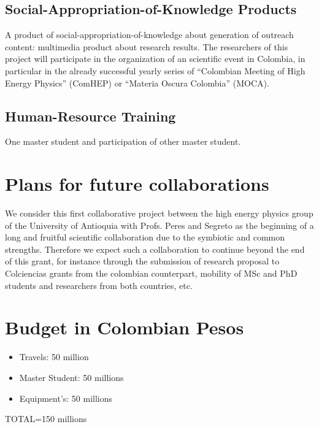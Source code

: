 \documentclass[a4paper,10pt,epsfig,epsf,amsfonts,amsmath]{article}
\begin{document}
\subsection{ Social-Appropriation-of-Knowledge Products}

A product of social-appropriation-of-knowledge about generation of outreach content:  multimedia product about research results.
The researchers of this project will participate in the organization of an scientific event in Colombia, in particular in the already successful yearly series of ``Colombian Meeting of High Energy Physics'' (ComHEP) or ``Materia Oscura Colombia'' (MOCA).

\subsection{Human-Resource Training}
One master student and participation of other master student.
\section{Plans for future collaborations}
We consider this first collaborative project between the high energy physics group of the University of Antioquia with Profs. Peres and Segreto as the beginning of a long and fruitful scientific collaboration due to the symbiotic and common strengths. 
Therefore we expect such a collaboration to continue beyond the end of this grant, for instance through the submission of research proposal to Colciencias grants from the colombian counterpart, mobility of MSc and PhD students and researchers from both countries, etc.      





\section{Budget in Colombian Pesos}
\begin{itemize}
    \item Travels: 50 million
    \item Master Student: 50 millions
    \item Equipment's: 50 millions
\end{itemize}
TOTAL=150 millions



%


\end{document}
